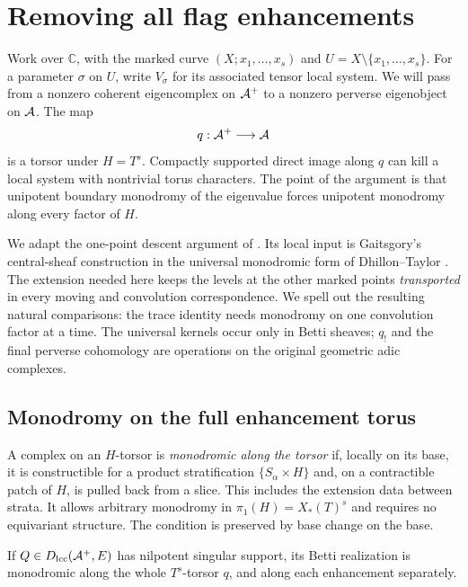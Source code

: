 \section{Removing all flag enhancements}\label{desc:section}

Work over $\mathbb C$, with the marked curve $(X;x_1,\ldots,x_s)$
and $U=X\setminus\{x_1,\ldots,x_s\}$.  For a parameter $\sigma$
on $U$, write $V_\sigma$ for its associated tensor local system.
We will pass from a nonzero
coherent eigencomplex on $\mathcal A^+$ to a nonzero perverse eigenobject on
$\mathcal A$.  The map
\[
                         q:\mathcal A^+\longrightarrow\mathcal A
\]
is a torsor under $H=T^s$.  Compactly supported direct image along
$q$ can kill a local system with nontrivial torus characters.  The
point of the argument is that unipotent boundary monodromy of the
eigenvalue forces unipotent monodromy along every factor of $H$.

We adapt the one-point descent argument of \cite[Section~7]{CT}.
Its local input is Gaitsgory's central-sheaf construction
\cite{GaitsgoryCentral} in the universal monodromic form of
Dhillon--Taylor \cite{DT}.  The extension needed here keeps the levels
at the other marked points \emph{transported} in every moving and
convolution correspondence.  We spell out the resulting natural
comparisons: the trace identity needs monodromy on one convolution
factor at a time.  The universal kernels occur only in Betti sheaves;
$q_!$ and the final perverse cohomology are operations on the original
geometric adic complexes.

\subsection{Monodromy on the full enhancement torus}

A complex on an $H$-torsor is \emph{monodromic along the torsor} if,
locally on its base, it is constructible for a product stratification
$\{S_\alpha\times H\}$ and, on a contractible patch of $H$, is pulled
back from a slice.  This includes the extension data between strata.
It allows arbitrary monodromy in $\pi_1(H)=X_*(T)^s$ and requires no
equivariant structure.  The condition is preserved by base change on
the base.

\begin{lemma}\label{desc:monodromic}
If $Q\in D_{\mathrm{lcc}}(\mathcal A^+,E)$ has nilpotent singular support, its Betti
realization is monodromic along the whole $T^s$-torsor $q$, and along
each enhancement separately.
\end{lemma}

